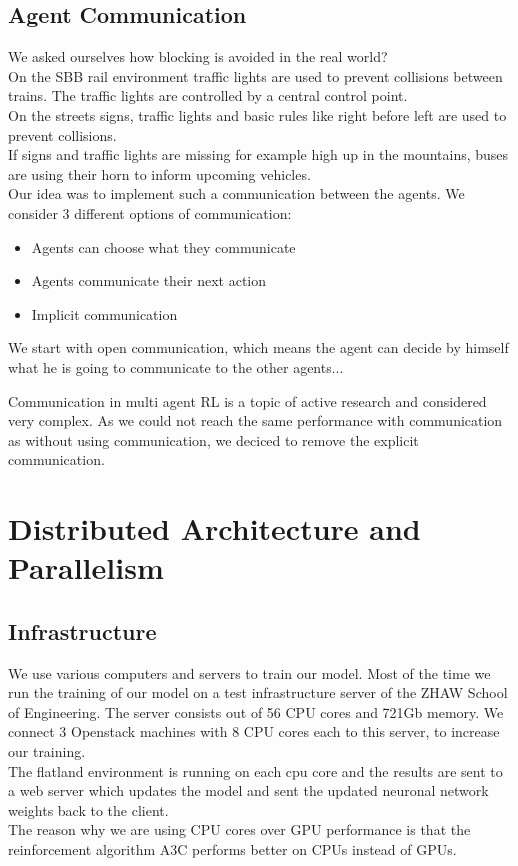 \subsection*{Agent Communication}\label{agent_communication}
We asked ourselves how blocking is avoided in the real world?\\
On the SBB rail environment traffic lights are used to prevent collisions between trains. The traffic lights are controlled by a central control point.\\
On the streets signs, traffic lights and basic rules like right before left are used to prevent collisions. \\
If signs and traffic lights are missing for example high up in the mountains, buses are using their horn to inform upcoming vehicles. \\
Our idea was to implement such a communication between the agents.
We consider 3 different options of communication:
\begin{itemize}
	\item Agents can choose what they communicate
	\item Agents communicate their next action
	\item Implicit communication
\end{itemize}

We start with open communication, which means the agent can decide by himself what he is going to communicate to the other agents... %

Communication in multi agent RL is a topic of active research and considered very complex. As we could not reach the same performance with communication as without using communication, we deciced to remove the explicit communication.


\section{Distributed Architecture and Parallelism}\label{dist_architecture}
\subsection*{Infrastructure}\label{infrastructure}
We use various computers and servers to train our model. Most of the time we run the training of our model on a test infrastructure server of the ZHAW School of Engineering.
The server consists out of 56 CPU cores and 721Gb memory. We connect 3 Openstack machines with 8 CPU cores each to this server, to increase our training. \\
The flatland environment is running on each cpu core and the results are sent to a web server which updates the model and sent the updated neuronal network weights back to the client. \\
The reason why we are using CPU cores over GPU performance is that the reinforcement algorithm A3C performs better on CPUs instead of GPUs. \\  %

